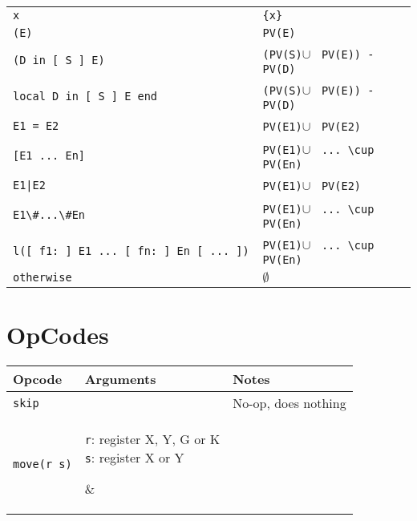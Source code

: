 \documentclass[a4paper]{memoir}
\begin{document}
\begin{appendices}
\begin{tabular} {l l}
\lstinline!x                                       ! & \lstinline!{x} !                                   \\
\lstinline!(E)                                     ! & \lstinline!PV(E) !                                    \\
\lstinline!(D in [ S ] E)                          ! & \lstinline!(PV(S)!$\cup$ \lstinline! PV(E)) - PV(D) !\\
\lstinline!local D in [ S ] E end                  ! & \lstinline!(PV(S)!$\cup$ \lstinline! PV(E)) - PV(D) !\\
\lstinline!E1 = E2                                 ! & \lstinline!PV(E1)!$\cup$ \lstinline! PV(E2)         !\\
\lstinline![E1 ... En]                             ! & \lstinline!PV(E1)!$\cup$ \lstinline! ... \cup PV(En)!\\
\lstinline!E1|E2                                   ! & \lstinline!PV(E1)!$\cup$ \lstinline! PV(E2)         !\\
\lstinline!E1\#...\#En                             ! & \lstinline!PV(E1)!$\cup$ \lstinline! ... \cup PV(En)!\\
\lstinline!l([ f1: ] E1 ... [ fn: ] En [ ... ])    ! & \lstinline!PV(E1)!$\cup$ \lstinline! ... \cup PV(En)!\\
\lstinline!otherwise                               ! &              $\emptyset$                               \\
\end{tabular}

\openany

\chapter{OpCodes}\label{appendix:opcodes}

\begin{tabular} {p{4cm}p{4cm}p{5cm}}
Opcode & Arguments& Notes \\
\hline
\lstinline!skip! & & No-op, does nothing\\

\hline 
\lstinline!move(r s)! & 

\parbox[t][][t]{4cm}{
\lstinline!r!: register X, Y, G or K\\
\lstinline!s!: register X or Y
}

&


\end{tabular}
\end{appendices}
\end{document}
